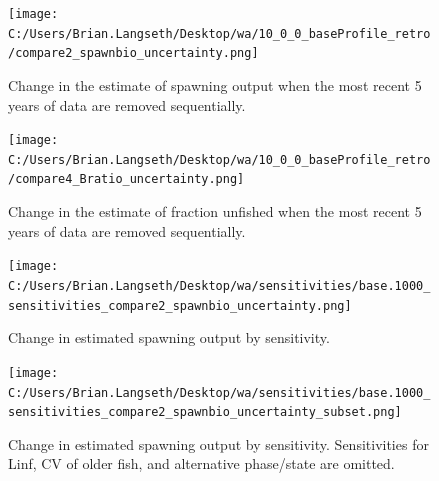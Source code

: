 \documentclass[11pt,
  english,
  a4paper,
]{article}
\begin{document}
\tagmcend\tagstructend


\begin{figure}
\centering
\texttt{[image: C:/Users/Brian.Langseth/Desktop/wa/10\_0\_0\_baseProfile\_retro/compare2\_spawnbio\_uncertainty.png]}
\caption{Change in the estimate of spawning output when the most recent 5 years of data are removed sequentially.\label{fig:retro-ssb}}
\end{figure}

\tagmcend\tagstructend


\begin{figure}
\centering
\texttt{[image: C:/Users/Brian.Langseth/Desktop/wa/10\_0\_0\_baseProfile\_retro/compare4\_Bratio\_uncertainty.png]}
\caption{Change in the estimate of fraction unfished when the most recent 5 years of data are removed sequentially.\label{fig:retro-depl}}
\end{figure}

\tagmcend\tagstructend

\newpage


\begin{figure}
\centering
\texttt{[image: C:/Users/Brian.Langseth/Desktop/wa/sensitivities/base.1000\_sensitivities\_compare2\_spawnbio\_uncertainty.png]}
\caption{Change in estimated spawning output by sensitivity.\label{fig:sens-ssb}}
\end{figure}

\tagmcend\tagstructend


\begin{figure}
\centering
\texttt{[image: C:/Users/Brian.Langseth/Desktop/wa/sensitivities/base.1000\_sensitivities\_compare2\_spawnbio\_uncertainty\_subset.png]}
\caption{Change in estimated spawning output by sensitivity. Sensitivities for Linf, CV of older fish, and alternative phase/state are omitted.\label{fig:sens-ssb-subset}}
\end{figure}
\end{document}
